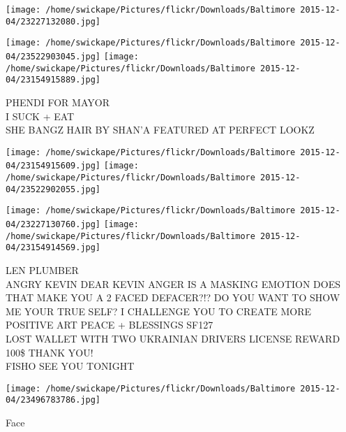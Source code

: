 \documentclass[10pt,letterpaper]{article}
\begin{document}
\texttt{[image: /home/swickape/Pictures/flickr/Downloads/Baltimore 2015-12-04/23227132080.jpg]}

\vspace{0.25in}
\texttt{[image: /home/swickape/Pictures/flickr/Downloads/Baltimore 2015-12-04/23522903045.jpg]}
\texttt{[image: /home/swickape/Pictures/flickr/Downloads/Baltimore 2015-12-04/23154915889.jpg]}

PHENDI FOR MAYOR\\
I SUCK + EAT\\
SHE BANGZ HAIR BY SHAN'A FEATURED AT PERFECT LOOKZ\\
\pagebreak

\texttt{[image: /home/swickape/Pictures/flickr/Downloads/Baltimore 2015-12-04/23154915609.jpg]}
\texttt{[image: /home/swickape/Pictures/flickr/Downloads/Baltimore 2015-12-04/23522902055.jpg]}

\texttt{[image: /home/swickape/Pictures/flickr/Downloads/Baltimore 2015-12-04/23227130760.jpg]}
\texttt{[image: /home/swickape/Pictures/flickr/Downloads/Baltimore 2015-12-04/23154914569.jpg]}

LEN PLUMBER\\
ANGRY KEVIN DEAR KEVIN ANGER IS A MASKING EMOTION DOES THAT MAKE YOU A 2 FACED DEFACER?!?  DO YOU WANT TO SHOW ME YOUR TRUE SELF?  I CHALLENGE YOU TO CREATE MORE POSITIVE ART PEACE + BLESSINGS SF127\\
LOST WALLET WITH TWO UKRAINIAN DRIVERS LICENSE REWARD 100\$ THANK YOU!\\
FISHO SEE YOU TONIGHT\\
\pagebreak

\texttt{[image: /home/swickape/Pictures/flickr/Downloads/Baltimore 2015-12-04/23496783786.jpg]}

Face\\
\pagebreak
\end{document}
